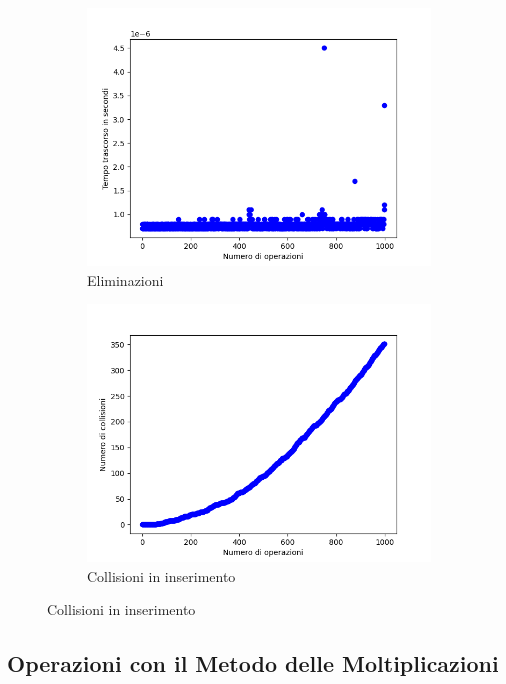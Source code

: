 \documentclass{article}
\begin{document}
\begin{figure}[h]
\begin{subfigure}{0.49\textwidth}
					\includegraphics[width = \textwidth]{HDM_Deletions}
					\caption{Eliminazioni}
				\end{subfigure}

				\begin{subfigure}{0.49\textwidth}
					\centering
					\includegraphics[width = \textwidth]{HDM_CollisionsOnInsertions}
					\caption{Collisioni in inserimento}
				\end{subfigure}

			\end{figure}
		
		\clearpage
		\subsection{Operazioni con il Metodo delle Moltiplicazioni}
\end{document}
